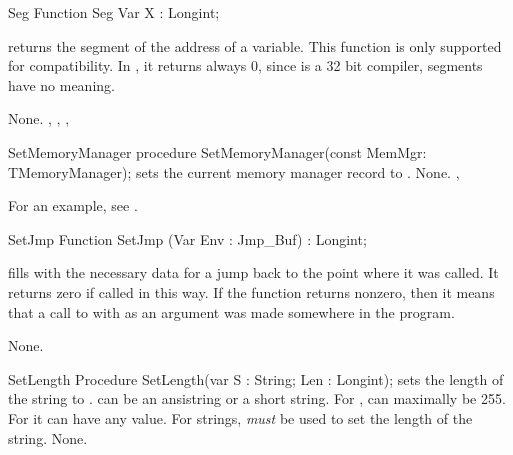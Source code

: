 \documentclass{report}
\begin{document}

\begin{function}{Seg}
\Declaration
Function Seg Var X : Longint;

\Description
{} returns the segment of the address of a variable.
This function is only supported for compatibility. In \fpc, it
returns always 0, since \fpc is a 32 bit compiler, segments have no meaning.

\Errors
None.
\SeeAlso
{}, , , 
\end{function}


\begin{procedure}{SetMemoryManager}
\Declaration
procedure SetMemoryManager(const MemMgr: TMemoryManager);
\Description
{} sets the current memory manager record to 
. 
\Errors
None.
\SeeAlso
{}, 
\end{procedure}

For an example, see \progref.

\begin{function}{SetJmp}
\Declaration
Function SetJmp (Var Env : Jmp\_Buf) : Longint;

\Description

 fills  with the necessary data for a jump back to the
point where it was called. It returns zero if called in this way.
If the function returns nonzero, then it means that a call to 
with  as an argument was made somewhere in the program.

\Errors
None.
\SeeAlso
{}
\end{function}



\begin{procedure}{SetLength}
\Declaration
Procedure SetLength(var S : String; Len : Longint);
\Description
{} sets the length of the string  to . 
can be an ansistring or a short string. 
For ,  can maximally be 255. For 
it can have any value. For  strings,  {\em
must} be used to set the length of the string.
\Errors
None.
\SeeAlso
{}
\end{procedure}


\end{document}
